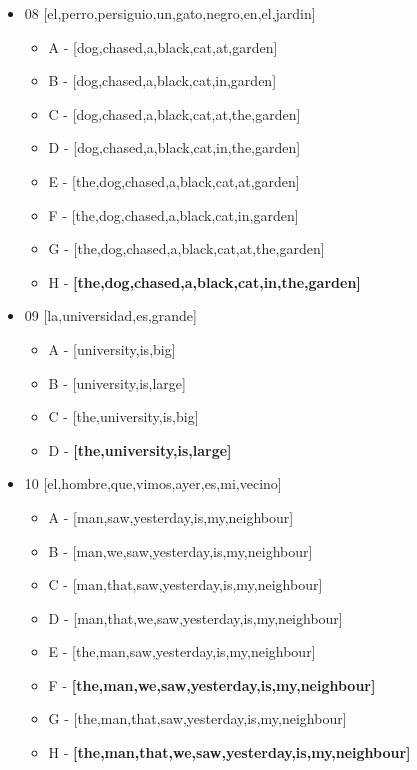 \documentclass{article}
\begin{document}
\begin{itemize}
    \item 08 [el,perro,persiguio,un,gato,negro,en,el,jardin]
    \begin{itemize}
        \item A - [dog,chased,a,black,cat,at,garden]
        \item B - [dog,chased,a,black,cat,in,garden]
        \item C - [dog,chased,a,black,cat,at,the,garden]
        \item D - [dog,chased,a,black,cat,in,the,garden]
        \item E - [the,dog,chased,a,black,cat,at,garden]
        \item F - [the,dog,chased,a,black,cat,in,garden]
        \item G - [the,dog,chased,a,black,cat,at,the,garden]
        \item H - \textbf{[the,dog,chased,a,black,cat,in,the,garden]}
    \end{itemize}

    \item 09 [la,universidad,es,grande]
    \begin{itemize}
        \item A - [university,is,big]
        \item B - [university,is,large]
        \item C - [the,university,is,big]
        \item D - \textbf{[the,university,is,large]}
    \end{itemize}

    \item 10 [el,hombre,que,vimos,ayer,es,mi,vecino]
    \begin{itemize}
        \item A - [man,saw,yesterday,is,my,neighbour]
        \item B - [man,we,saw,yesterday,is,my,neighbour]
        \item C - [man,that,saw,yesterday,is,my,neighbour]
        \item D - [man,that,we,saw,yesterday,is,my,neighbour]
        \item E - [the,man,saw,yesterday,is,my,neighbour]
        \item F - \textbf{[the,man,we,saw,yesterday,is,my,neighbour]}
        \item G - [the,man,that,saw,yesterday,is,my,neighbour]
        \item H - \textbf{[the,man,that,we,saw,yesterday,is,my,neighbour]}
    \end{itemize}


\end{itemize}
\end{document}
